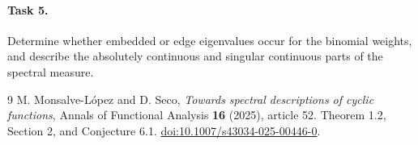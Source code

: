 \documentclass[11pt]{article}
\begin{document}
\paragraph{Task 5.}
Determine whether embedded or edge eigenvalues occur for the binomial
weights, and describe the absolutely continuous and singular continuous
parts of the spectral measure.

\begin{thebibliography}{9}
M. Monsalve-L\'opez and D. Seco,
\emph{Towards spectral descriptions of cyclic functions},
Annals of Functional Analysis \textbf{16} (2025), article 52.
Theorem 1.2, Section 2, and Conjecture 6.1.
\href{https://doi.org/10.1007/s43034-025-00446-0}
{doi:10.1007/s43034-025-00446-0}.
\end{thebibliography}
\end{document}
